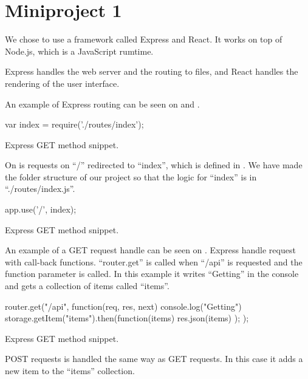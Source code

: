 \chapter{Miniproject 1}
We chose to use a framework called Express and React. 
It works on top of Node.js, which is a JavaScript rumtime. 

Express handles the web server and the routing to files, and React handles the rendering of the user interface.

An example of Express routing can be seen on  and .

\begin{listing}
    \begin{js}
        var index = require('./routes/index');
    \end{js}
    \caption{Express GET method snippet.}
    \label{lst:express_route}
\end{listing}

On  is requests on ``/'' redirected to ``index'', which is defined in .
We have made the folder structure of our project so that the logic for ``index'' is in ``./routes/index.js''.

\begin{listing}
    \begin{js}
        app.use('/', index);
    \end{js}
    \caption{Express GET method snippet.}
    \label{lst:express_route_use}
\end{listing}

An example of a GET request handle can be seen on .
Express handle request with call-back functions.
``router.get'' is called when ``/api'' is requested and the function parameter is called. 
In this example it writes ``Getting'' in the console and gets a collection of items called ``items''.

\begin{listing}
    \begin{js}
        router.get("/api", function(req, res, next) {
            console.log("Getting")
            storage.getItem("items").then(function(items) {
                res.json(items)
            });
        });
    \end{js}
    \caption{Express GET method snippet.}
    \label{lst:express_get}
\end{listing}

POST requests is handled the same way as GET requests. 
In this case it adds a new item to the ``items'' collection.

